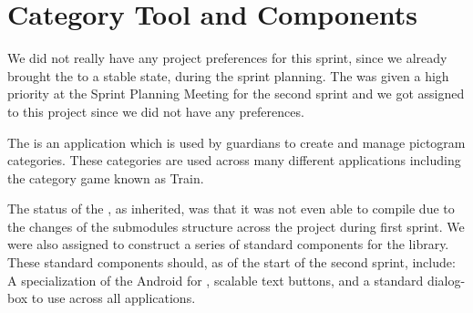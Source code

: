 \section{Category Tool and Components}

We did not really have any project preferences for this sprint, since we already brought the \launcher to a stable state, during the sprint planning. The \giraf \ct was given a high priority at the Sprint Planning Meeting for the second sprint and we got assigned to this project since we did not have any preferences. 

The \giraf \ct is an application which is used by guardians to create and manage pictogram categories. These categories are used across many different applications including the category game known as Train.

The status of the \ct, as inherited, was that it was not even able to compile due to the changes of the submodules structure across the project during first sprint. We were also assigned to construct a series of standard components for the \gc library. These standard components should, as of the start of the second sprint, include: A specialization of the Android  for \giraf, scalable text buttons, and a standard dialog-box to use across all applications.
